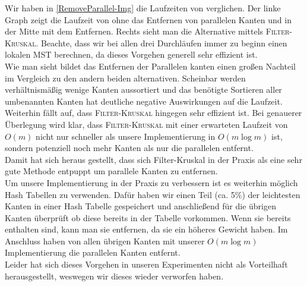 Wir haben in \cref{RemoveParallel-Img} die Laufzeiten von \boruvkaAllreduce verglichen. Der linke Graph zeigt die Laufzeit von \boruvkaAllreduce ohne das Entfernen von parallelen Kanten und in der Mitte mit dem Entfernen. Rechts sieht man die Alternative mittels \textsc{Filter-Kruskal}. Beachte, dass wir bei allen drei Durchläufen immer zu beginn einen lokalen MST berechnen, da dieses Vorgehen generell sehr effizient ist.\\
Wie man sieht bildet das Entfernen der Parallelen kanten einen großen Nachteil im Vergleich zu den andern beiden alternativen. Scheinbar werden verhältnismäßig wenige Kanten aussortiert und das benötigte Sortieren aller umbenannten Kanten hat deutliche negative Auswirkungen auf die Laufzeit.\\
Weiterhin fällt auf, dass \textsc{Filter-Kruskal} hingegen sehr effizient ist. Bei genauerer Überlegung wird klar, dass \textsc{Filter-Kruskal} mit einer erwarteten Laufzeit von $O(m)$ nicht nur schneller als unsere Implementierung in $O(m \log m)$ ist, sondern potenziell noch mehr Kanten als nur die parallelen entfernt. \\
Damit hat sich heraus gestellt, dass sich Filter-Kruskal in der Praxis als eine sehr gute Methode entpuppt um parallele Kanten zu entfernen.\\
Um unsere Implementierung in der Praxis zu verbessern ist es weiterhin möglich Hash Tabellen zu verwenden. Dafür haben wir einen Teil (ca. 5\%) der leichtesten Kanten in einer Hash Tabelle gespeichert und anschließend für die übrigen Kanten überprüft ob diese bereits in der Tabelle vorkommen. Wenn sie bereits enthalten sind, kann man sie entfernen, da sie ein höheres Gewicht haben. Im Anschluss haben von allen übrigen Kanten mit unserer $O(m \log m)$ Implementierung die parallelen Kanten entfernt. \\
Leider hat sich dieses Vorgehen in unseren Experimenten nicht als Vorteilhaft herausgestellt, weswegen wir dieses wieder verworfen haben.





